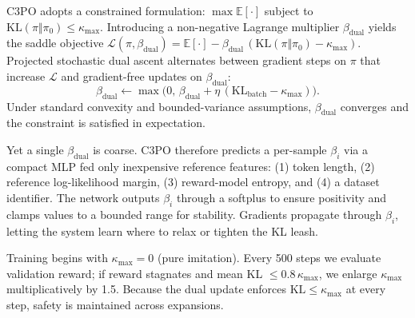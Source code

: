 \documentclass{article}
\begin{document}
C3PO adopts a constrained formulation:
\(\max \mathbb{E}[\cdot]\) subject to \(\mathrm{KL}(\pi\Vert\pi_{0}) \le \kappa_{\max}\).
Introducing a non-negative Lagrange multiplier \(\beta_{\text{dual}}\) yields the saddle objective
\(\mathcal{L}(\pi,\beta_{\text{dual}}) = \mathbb{E}[\cdot] - \beta_{\text{dual}}\,(\mathrm{KL}(\pi\Vert\pi_{0}) - \kappa_{\max})\).
Projected stochastic dual ascent alternates between gradient steps on \(\pi\) that increase \(\mathcal{L}\) and gradient-free updates on \(\beta_{\text{dual}}\):
\[\beta_{\text{dual}} \leftarrow \max\bigl(0,\, \beta_{\text{dual}} + \eta\,(\mathrm{KL}_{\text{batch}} - \kappa_{\max})\bigr).\]
Under standard convexity and bounded-variance assumptions, \(\beta_{\text{dual}}\) converges and the constraint is satisfied in expectation.

Yet a single \(\beta_{\text{dual}}\) is coarse. C3PO therefore predicts a per-sample \(\beta_i\) via a compact MLP fed only inexpensive reference features: (1) token length, (2) reference log-likelihood margin, (3) reward-model entropy, and (4) a dataset identifier. The network outputs \(\beta_i\) through a softplus to ensure positivity and clamps values to a bounded range for stability. Gradients propagate through \(\beta_i\), letting the system learn where to relax or tighten the KL leash.

Training begins with \(\kappa_{\max}=0\) (pure imitation). Every 500 steps we evaluate validation reward; if reward stagnates and mean KL \(\le 0.8\,\kappa_{\max}\), we enlarge \(\kappa_{\max}\) multiplicatively by 1.5. Because the dual update enforces \(\mathrm{KL} \le \kappa_{\max}\) at every step, safety is maintained across expansions.
\end{document}
